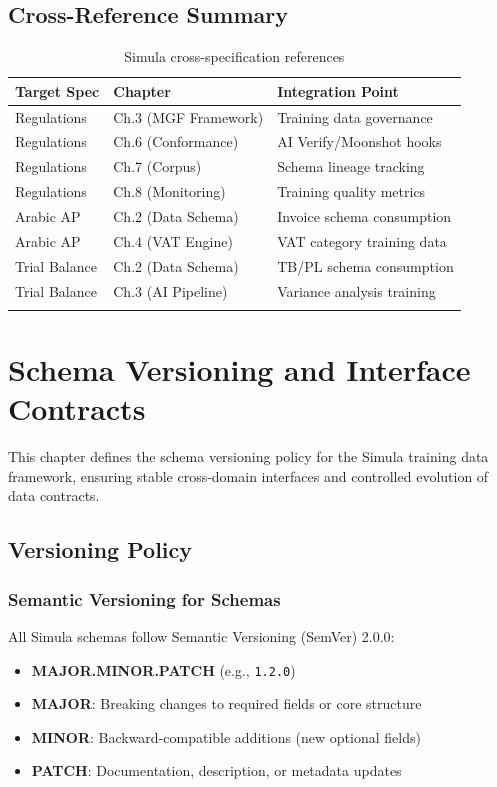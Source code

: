 \documentclass[12pt,a4paper,twoside]{report}
\begin{document}
\section{Cross-Reference Summary}
\label{sec:xref-summary}

\begin{longtable}{@{}p{3.5cm}p{4cm}p{5cm}@{}}
\toprule
\textbf{Target Spec} & \textbf{Chapter} & \textbf{Integration Point} \\
\midrule
\endhead
Regulations & Ch.3 (MGF Framework) & Training data governance \\
Regulations & Ch.6 (Conformance) & AI Verify/Moonshot hooks \\
Regulations & Ch.7 (Corpus) & Schema lineage tracking \\
Regulations & Ch.8 (Monitoring) & Training quality metrics \\
\midrule
Arabic AP & Ch.2 (Data Schema) & Invoice schema consumption \\
Arabic AP & Ch.4 (VAT Engine) & VAT category training data \\
\midrule
Trial Balance & Ch.2 (Data Schema) & TB/PL schema consumption \\
Trial Balance & Ch.3 (AI Pipeline) & Variance analysis training \\
\bottomrule
\caption{Simula cross-specification references}
\end{longtable}
\chapter{Schema Versioning and Interface Contracts}
\label{chap:schema-versioning}

This chapter defines the schema versioning policy for the Simula training data
framework, ensuring stable cross-domain interfaces and controlled evolution of
data contracts.

\section{Versioning Policy}

\subsection{Semantic Versioning for Schemas}

All Simula schemas follow Semantic Versioning (SemVer) 2.0.0:

\begin{itemize}
\item \textbf{MAJOR.MINOR.PATCH} (e.g., \texttt{1.2.0})
\item \textbf{MAJOR}: Breaking changes to required fields or core structure
\item \textbf{MINOR}: Backward-compatible additions (new optional fields)
\item \textbf{PATCH}: Documentation, description, or metadata updates
\end{itemize}
\end{document}
